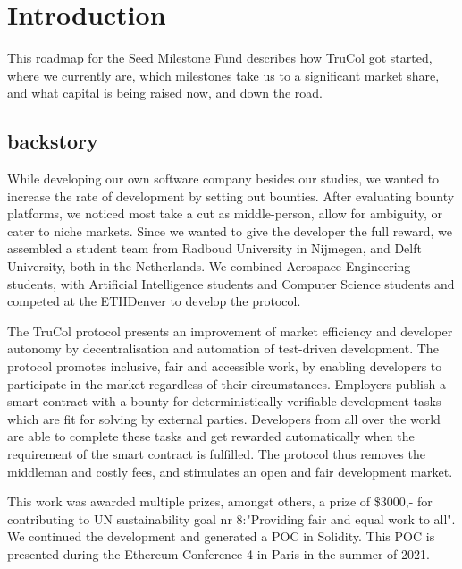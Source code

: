 \section{Introduction}
This roadmap for the Seed Milestone Fund describes how TruCol got started, where we currently are, which milestones take us to a significant market share, and what capital is being raised now, and down the road.

\subsection{backstory}
While developing our own software company besides our studies, we wanted to increase the rate of development by setting out bounties. After evaluating bounty platforms, we noticed most take a cut as middle-person, allow for ambiguity, or cater to niche markets. Since we wanted to give the developer the full reward, we assembled a student team from Radboud University in Nijmegen, and Delft University, both in the Netherlands. We combined Aerospace Engineering students, with Artificial Intelligence students and Computer Science students and competed at the ETHDenver to develop the protocol.

The TruCol protocol presents an improvement of market efficiency and developer autonomy by decentralisation and automation of test-driven development. The protocol promotes inclusive, fair and accessible work, by enabling developers to participate in the market regardless of their circumstances. Employers publish a smart contract with a bounty for deterministically verifiable development tasks which are fit for solving by external parties. Developers from all over the world are able to complete these tasks and get rewarded automatically when the requirement of the smart contract is fulfilled. The protocol thus removes the middleman and costly fees, and stimulates an open and fair development market.

This work was awarded multiple prizes, amongst others, a prize of \$3000,- for contributing to UN sustainability goal nr 8:"Providing fair and equal work to all". We continued the development and generated a POC in Solidity. This POC is presented during the Ethereum Conference 4 in Paris in the summer of 2021.
